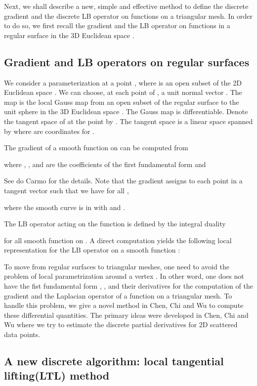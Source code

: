 \documentclass{elsart}
\begin{document}
    Next, we shall describe a new, simple and effective method
to define the discrete gradient and the discrete LB operator on
functions on a triangular mesh. In order to do so, we first recall
the gradient and the LB operator on functions in a regular surface
 in the 3D Euclidean space .

\subsection{Gradient and LB operators on regular surfaces }
We consider a parameterization  at a point
, where  is an open subset of the 2D Euclidean space
. We can choose, at each point  of , a unit
normal vector . The map  is the local
Gauss map from an open subset of the regular surface  to the
unit sphere in the 3D Euclidean space . The Gauss map
 is differentiable. Denote the tangent space of  at the
point  by .
The tangent space  is a linear space spanned by  where  are coordinates for .


The gradient  of a smooth function  on  can be
computed from




where , , and  are the coefficients of the first
fundamental form and


See do Carmo\cite{Do} for the details. Note that the gradient
 assigns to each point  in  a tangent vector
 such that we have for all ,

where the smooth curve  is in  with 
and .


    The LB operator  acting on the function  is defined by the
integral duality


for all smooth function  on . A direct computation
yields the following local representation for the LB operator on a
smooth function :





To move from regular surfaces to triangular meshes, one need to
avoid the problem of local parametrization  around a vertex .
In other word, one does not have the fist fundamental form , ,
 and their derivatives for the computation of the gradient and
the Laplacian operator of a function on a triangular mesh. To handle
this problem, we give a novel method in Chen, Chi and Wu\cite{Chen5}
to compute these differential quantities. The primary ideas were
developed in Chen, Chi and Wu\cite{Chen4} where we try to estimate
the discrete partial derivatives for 2D scattered data points.


\subsection{ A new discrete algorithm: local tangential lifting(LTL) method}
\end{document}
